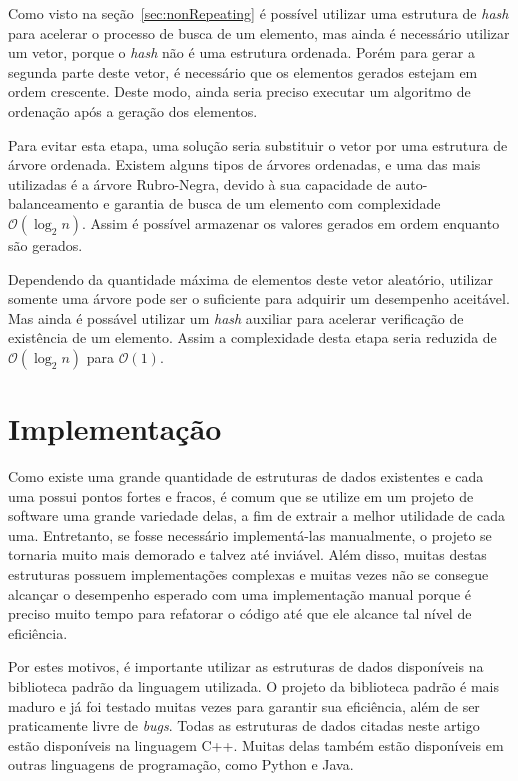 \documentclass[12pt]{article}
\begin{document}
Como visto na se\c{c}\~{a}o~\ref{sec:nonRepeating} \'{e} poss\'{i}vel utilizar uma estrutura de \textit{hash} para
acelerar o processo de busca de um elemento, mas ainda \'{e} necess\'{a}rio utilizar um vetor, porque o
\textit{hash} n\~{a}o \'{e} uma estrutura ordenada. Por\'{e}m para gerar a segunda parte deste vetor, \'{e} necess\'{a}rio que
os elementos gerados estejam em ordem crescente. Deste modo, ainda seria preciso executar um
algoritmo de ordena\c{c}\~{a}o ap\'{o}s a gera\c{c}\~{a}o dos elementos.

Para evitar esta etapa, uma solu\c{c}\~{a}o seria substituir o vetor por uma estrutura de \'{a}rvore ordenada. Existem
alguns tipos de \'{a}rvores ordenadas, e uma das mais utilizadas \'{e} a \'{a}rvore Rubro-Negra, devido \`{a} sua
capacidade de auto-balanceamento e garantia de busca de um elemento com complexidade $\mathcal{O}(\log_2n)$.
Assim \'{e} poss\'{i}vel armazenar os valores gerados em ordem enquanto s\~{a}o gerados.

Dependendo da quantidade m\'{a}xima de elementos deste vetor aleat\'{o}rio, utilizar somente uma \'{a}rvore pode
ser o suficiente para adquirir um desempenho aceit\'{a}vel. Mas ainda \'{e} poss\'{a}vel utilizar um \textit{hash}
auxiliar para acelerar verifica\c{c}\~{a}o de exist\^{e}ncia de um elemento. Assim a complexidade desta etapa seria
reduzida de $\mathcal{O}(\log_2n)$ para $\mathcal{O}(1)$.

\section{Implementa\c{c}\~{a}o}

Como existe uma grande quantidade de estruturas de dados existentes e cada uma possui pontos fortes e fracos,
\'{e} comum que se utilize em um projeto de software uma grande variedade delas, a fim de extrair a melhor utilidade
de cada uma. Entretanto, se fosse necess\'{a}rio implement\'{a}-las manualmente, o projeto se tornaria muito mais
demorado e talvez at\'{e} invi\'{a}vel. Al\'{e}m disso, muitas destas estruturas possuem implementa\c{c}\~{o}es
complexas e muitas vezes n\~{a}o se consegue alcan\c{c}ar o desempenho esperado com uma implementa\c{c}\~{a}o manual
porque \'{e} preciso muito tempo para refatorar o c\'{o}digo at\'{e} que ele alcance tal n\'{i}vel de efici\^{e}ncia.

Por estes motivos, \'{e} importante utilizar as estruturas de dados dispon\'{i}veis na biblioteca padr\~{a}o da linguagem
utilizada. O projeto da biblioteca padr\~{a}o \'{e} mais maduro e j\'{a} foi testado muitas vezes para garantir sua
efici\^{e}ncia, al\'{e}m de ser praticamente livre de \textit{bugs}. Todas as estruturas de dados citadas neste artigo
est\~{a}o dispon\'{i}veis na linguagem C++. Muitas delas tamb\'{e}m est\~{a}o dispon\'{i}veis em outras linguagens de
programa\c{c}\~{a}o, como Python e Java.
\end{document}
